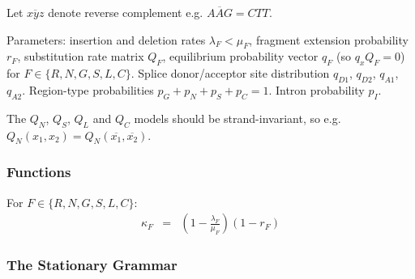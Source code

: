 Let $\overline{xyz}$ denote reverse complement e.g. $\overline{AAG}=CTT$.

Parameters: insertion and deletion rates $\lambda_F < \mu_F$, fragment extension probability $r_F$,
substitution rate matrix $Q_F$, equilibrium probability vector $q_F$ (so $q_x Q_F = 0$)
for $F \in \{ R, N, G, S, L, C \}$.
Splice donor/acceptor site distribution $q_{D1}$,  $q_{D2}$, $q_{A1}$, $q_{A2}$.
Region-type probabilities $p_G + p_N + p_S + p_C = 1$.
Intron probability $p_I$.

The $Q_N$, $Q_S$, $Q_L$ and $Q_C$ models should be strand-invariant, so e.g. $Q_N(x_1,x_2) = Q_N(\overline{x_1},\overline{x_2})$.

\subsubsection{Functions}

For $F \in \{ R, N, G, S, L, C \}$:
\begin{eqnarray*}
\kappa_F & = & \left( 1 - \frac{\lambda_F}{\mu_F} \right) \left( 1 - r_F \right)
\end{eqnarray*}


\subsubsection{The Stationary Grammar}

